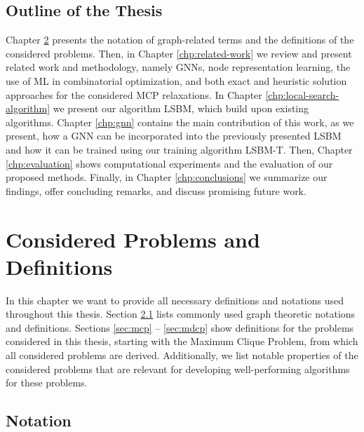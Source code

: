 \documentclass[draft,final]{vutinfth} %
\begin{document}
\section{Outline of the Thesis}\label{sec:outline}
Chapter \ref{chp:problems-definitions} presents the notation of graph-related terms and the definitions of the considered problems. Then, in Chapter \ref{chp:related-work} we review and present related work and methodology, namely GNNs, node representation learning, the use of ML in combinatorial optimization, and both exact and heuristic solution approaches for the considered MCP relaxations. In Chapter \ref{chp:local-search-algorithm} we present our algorithm LSBM, which build upon existing algorithms. Chapter \ref{chp:gnn} contains the main contribution of this work, as we present, how a GNN can be incorporated into the previously presented LSBM and how it can be trained using our training algorithm LSBM-T. Then, Chapter \ref{chp:evaluation} shows computational experiments and the evaluation of our proposed methods. Finally, in Chapter \ref{chp:conclusions} we summarize our findings, offer concluding remarks, and discuss promising future work. 

\chapter{Considered Problems and Definitions}\label{chp:problems-definitions}

In this chapter we want to provide all necessary definitions and notations used throughout this thesis. Section \ref{sec:notation} lists commonly used graph theoretic notations and definitions. Sections \ref{sec:mcp} -- \ref{sec:mdcp} show definitions for the problems considered in this thesis, starting with the Maximum Clique Problem, from which all considered problems are derived. Additionally, we list notable properties of the considered problems that are relevant for developing well-performing algorithms for these problems. 

\section{Notation}\label{sec:notation}
\end{document}

